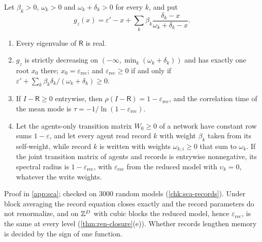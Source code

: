 \begin{proposition}\label{prop:sca-records}
Let $\beta_k>0$, $\omega_k>0$ and $\omega_k+\delta_k>0$ for every $k$, and put
\begin{equation}\label{eq:sca-secular}
g_z(x)=\varepsilon'-x+\sum_k\beta_k\frac{\delta_k-x}{\omega_k+\delta_k-x}.
\end{equation}
\begin{enumerate}
\item[(a)] Every eigenvalue of $\mathsf R$ is real.
\item[(b)] $g_z$ is strictly decreasing on $(-\infty,\min_k(\omega_k+\delta_k))$ and has exactly one root $x_0$ there; $x_0=\varepsilon_{\mathrm{rec}}$; and $\varepsilon_{\mathrm{rec}}\ge0$ if and only if $\varepsilon'+\sum_k\beta_k\delta_k/(\omega_k+\delta_k)\ge0$.
\item[(c)] If $I-\mathsf R\ge0$ entrywise, then $\rho(I-\mathsf R)=1-\varepsilon_{\mathrm{rec}}$, and the correlation time of the mean mode is $\tau=-1/\ln(1-\varepsilon_{\mathrm{rec}})$.
\item[(d)] Let the agents-only transition matrix $W_0\ge0$ of a network have constant row sums $1-\varepsilon$, and let every agent read record $k$ with weight $\beta_k$ taken from its self-weight, while record $k$ is written with weights $\omega_{k,i}\ge0$ that sum to $\omega_k$. If the joint transition matrix of agents and records is entrywise nonnegative, its spectral radius is $1-\varepsilon_{\mathrm{rec}}$, with $\varepsilon_{\mathrm{rec}}$ from the reduced model with $\upsilon_k=0$, whatever the write weights.
\end{enumerate}
\end{proposition}
Proof in \cref{app:sca}; checked on 3000 random models (\cref{chk:sca-records}). Under block averaging the record equation closes exactly and the record parameters do not renormalize, and on $\mathbb{Z}^D$ with cubic blocks the reduced model, hence $\varepsilon_{\mathrm{rec}}$, is the same at every level (\cref{thm:ren-closure}(e)). Whether records lengthen memory is decided by the sign of one function.

